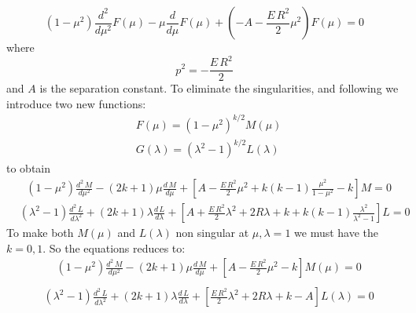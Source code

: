 \begin{equation}
 \left(1 - \mu^2 \right) \frac{d^2}{ d\mu^2 }F(\mu) - \mu\frac{ d }{d\mu }F(\mu) +  \left(-A -  \frac{E\,R^2}{2}\mu^2  \right)F(\mu) = 0
\end{equation}
where
\begin{equation}\label{eqP}
p^2 = -\frac{E\,R^2}{2}
\end{equation}
and $ A $ is the separation constant.  To eliminate the singularities, and following \cite{H2Plus2d1} we introduce two new functions:
\begin{equation}\label{eqNew}
\begin{split}
& F(\mu) = (1-\mu^2)^{k/2}M(\mu) \\[.8em]
& G(\lambda) = (\lambda^2-1)^{k/2}L(\lambda)
\end{split}
\end{equation}
to obtain
\begin{equation}
\begin{split}
& (1-\mu^2)\frac{d^2\,M}{d\mu^2} - (2k+1)\mu\frac{d\,M}{d\mu} +   \left[ A -  \frac{E\,R^2}{2}\mu^2  + k(k-1)\frac{\mu^2}{1-\mu^2} - k  \right]M = 0
\end{split}
\end{equation}
\begin{equation}
\begin{split}
& (\lambda^2-1)\frac{d^2\,L}{d\lambda^2} + (2k+1)\lambda \frac{d\,L}{d\lambda} +  \left[A + \frac{E\,R^2}{2}\lambda^2 + 2R\lambda  + k + k(k-1)\frac{\lambda^2}{\lambda^2-1} \right]L = 0
\end{split}
\end{equation}
To make both $ M(\mu) $ and $ L(\lambda) $ non singular at $ \mu, \lambda= 1$ we must have the $ k = 0, 1 $. So the equations reduces to:
\begin{equation}\label{M1}
\begin{split}
& (1-\mu^2)\frac{d^2\,M}{d\mu^2}  - (2k+1)\mu\frac{d\,M}{d\mu} +   \left[ A -  \frac{E\,R^2}{2}\mu^2  -  k  \right]M(\mu) = 0 \\[.8em]
\end{split}
\end{equation}
\begin{equation}\label{L1}
\begin{split}
& (\lambda^2-1)\frac{d^2\,L}{d\lambda^2} + (2k+1)\lambda \frac{d\,L}{d\lambda} +  \left[\frac{E\,R^2}{2}\lambda^2 + 2R\lambda  + k - A\right]L(\lambda) = 0
\end{split}
\end{equation}

